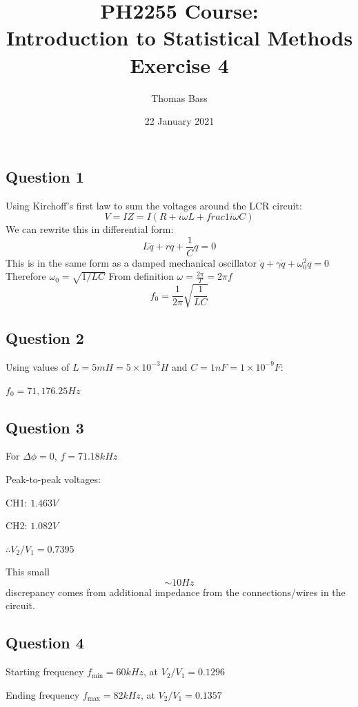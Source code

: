 \documentclass[a4paper]{article}
\title{PH2255 Course:\\
Introduction to Statistical Methods\\Exercise 4}
\author{Thomas Bass}
\date{22 January 2021}
\begin{document}
\maketitle

\subsection{Question 1}
Using Kirchoff's first law to sum the voltages around the LCR circuit:
\begin{equation}
V = IZ = I\left(R+i\omega L+
frac1{i\omega C}\right)
\end{equation}
We can rewrite this in differential form:
\begin{equation}
L\ddot{q}+r\dot{q}+\frac1Cq=0
\end{equation}
This is in the same form as a damped mechanical oscillator $\ddot{q}+\gamma\dot{q}+\omega_0^2q=0$
Therefore $\omega_0=\sqrt{1/LC}$
From definition $\omega=\frac{2\pi}T=2\pi f$
\begin{equation}
f_0=\frac1{2\pi}\sqrt{\frac1{LC}}
\end{equation}

\subsection{Question 2}
Using values of $L=5mH=5\times10^{-3}H$ and $C=1nF=1\times10^{-9}F$:

$f_0=71,176.25Hz$

\subsection{Question 3}
For $\Delta\phi=0$, $f=71.18kHz$

Peak-to-peak voltages:

CH1: $1.463 V$

CH2: $1.082 V$

$\therefore V_2/V_1=0.7395$

This small $$\sim10Hz$$ discrepancy comes from additional impedance from the connections/wires in the circuit.

\subsection{Question 4}

Starting frequency $f_\text{min}=60kHz$, at $V_2/V_1=0.1296$

Ending frequency $f_\text{max}=82kHz$, at $V_2/V_1=0.1357$
\end{document}
